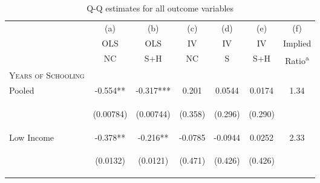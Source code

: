 \documentclass{article}[11pt,subeqn]
\begin{document}
\begin{spacing}{1.5}
\begin{table}[!htbp]														
\caption{Q-Q estimates for all outcome variables}														
\vspace{-3mm}														
\label{tab:fertilityALL}														
\begin{center}														
\begin{tabular}{lcccccc} \toprule														
& (a) & (b) & (c) & (d) & (e) & (f)\\														
& OLS & OLS & IV & IV & IV & Implied \\														
& NC & S+H & NC & S & S+H & Ratio\textsuperscript{a} \\														
\midrule														
\textsc{Years of Schooling} & & & & & &\\														
Pooled &		-0.554**	&	-0.317***	&	0.201	&	0.0544	&	0.0174	&	1.34		\\
\vspace{4pt} &	\begin{footnotesize}	(0.00784)	\end{footnotesize} & \begin{footnotesize}	(0.00744)	\end{footnotesize} & \begin{footnotesize}	(0.358)	\end{footnotesize} & \begin{footnotesize}	(0.296)	\end{footnotesize} & \begin{footnotesize}	(0.290)	\end{footnotesize} & \begin{footnotesize}		\end{footnotesize}	\\
Low Income &		-0.378**	&	-0.216**	&	-0.0785	&	-0.0944	&	0.0252	&	2.33		\\
\vspace{4pt} &	\begin{footnotesize}	(0.0132)	\end{footnotesize} & \begin{footnotesize}	(0.0121)	\end{footnotesize} & \begin{footnotesize}	(0.471)	\end{footnotesize} & \begin{footnotesize}	(0.426)	\end{footnotesize} & \begin{footnotesize}	(0.426)	\end{footnotesize} & \begin{footnotesize}		\end{footnotesize}	\\

\end{tabular}
\end{center}
\end{table}
\end{spacing}
\end{document}
